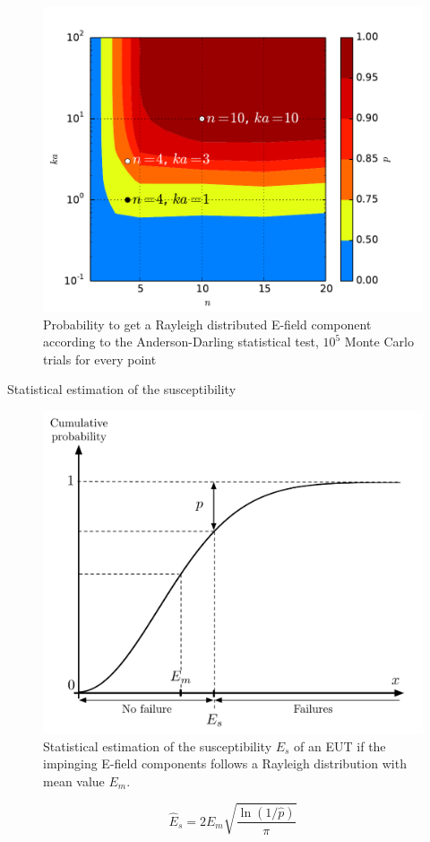 \documentclass[final,hyperref={pdfpagelabels=false}]{beamer}
\begin{document}
\begin{frame}{}
\begin{columns}[t]
    \begin{column}{0.32\linewidth}
\vspace{-1cm}
\vspace{-0.6cm}
\begin{figure}
\centering
\includegraphics[trim=0 0 0 0,clip,width=0.7\columnwidth]{./img/TestAD}
\vspace{-0.3cm}
\large{\caption{Probability to get a Rayleigh distributed E-field component according to the Anderson-Darling statistical test, $10^5$ Monte Carlo trials for every point}}
\end{figure}

 \begin{block}{Statistical estimation of the susceptibility}
\vspace{-0.6cm}
\begin{figure}
\centering
\includegraphics[trim=0 0 0 0,clip,width=0.8\columnwidth]{./img/rayleighCDF}
\vspace{-0.3cm}
\large{\caption{Statistical estimation of the susceptibility $E_s$ \cite{Amador13} of an EUT if the impinging E-field components follows a Rayleigh distribution with mean value $E_m$.}}
\end{figure}
\large{
\begin{equation*}
\hat{E}_s=2E_m\sqrt{\frac{\ln(1/\hat{p})}{\pi}}
\end{equation*}}



\end{block}
\end{column}
\end{columns}
\end{frame}
\end{document}
